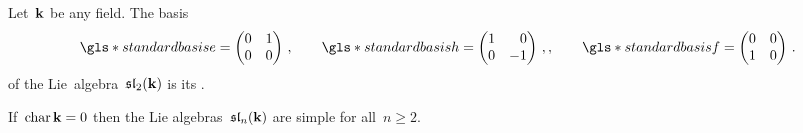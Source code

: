 \begin{definition}
 Let~$\mathbf{k}$ be any field.
 The basis
 \[
    \gls*{standard basis e}
    =
    \begin{pmatrix}
      0 & 1 \\
      0 & 0
    \end{pmatrix} \,,
    \qquad
    \gls*{standard basis h}
    =
    \begin{pmatrix*}[r]
      1 &  0  \\
      0 & -1
    \end{pmatrix*}  \,,,
    \qquad
    \gls*{standard basis f}
    =
    \begin{pmatrix}
      0 & 0 \\
      1 & 0
    \end{pmatrix} \,.
  \]
  of the Lie~algebra~$\mathfrak{sl}_2(\mathbf{k})$ is its .
\end{definition}


\begin{remark}
 If~$\operatorname{char} \mathbf{k} = 0$ then the Lie algebras~$\mathfrak{sl}_n(\mathbf{k})$ are simple for all~$n \geq 2$.
\end{remark}




